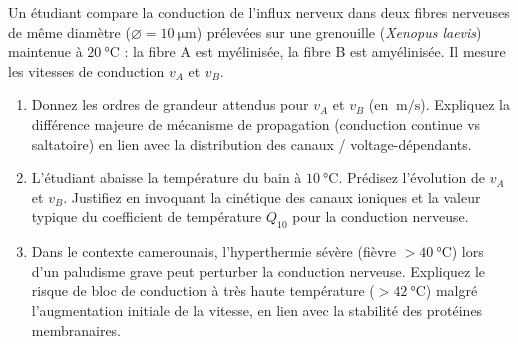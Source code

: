 \documentclass[11pt]{article}
\begin{document}
\begin{exercice}
Un étudiant compare la conduction de l'influx nerveux dans deux fibres nerveuses de même diamètre ($\varnothing = \SI{10}{\micro\meter}$) prélevées sur une grenouille (\textit{Xenopus laevis}) maintenue à $\SI{20}{\celsius}$ : la fibre A est myélinisée, la fibre B est amyélinisée. Il mesure les vitesses de conduction $v_A$ et $v_B$.
\begin{enumerate}
    \item Donnez les ordres de grandeur attendus pour $v_A$ et $v_B$ (en $\SI{}{\meter\per\second}$). Expliquez la différence majeure de mécanisme de propagation (conduction continue vs saltatoire) en lien avec la distribution des canaux / voltage-dépendants.
    \item L'étudiant abaisse la température du bain à $\SI{10}{\celsius}$. Prédisez l'évolution de $v_A$ et $v_B$. Justifiez en invoquant la cinétique des canaux ioniques et la valeur typique du coefficient de température $Q_{10}$ pour la conduction nerveuse.
    \item Dans le contexte camerounais, l'hyperthermie sévère (fièvre $> \SI{40}{\celsius}$) lors d'un paludisme grave peut perturber la conduction nerveuse. Expliquez le risque de bloc de conduction à très haute température ($> \SI{42}{\celsius}$) malgré l'augmentation initiale de la vitesse, en lien avec la stabilité des protéines membranaires.
\end{enumerate}
\end{exercice}
\end{document}

